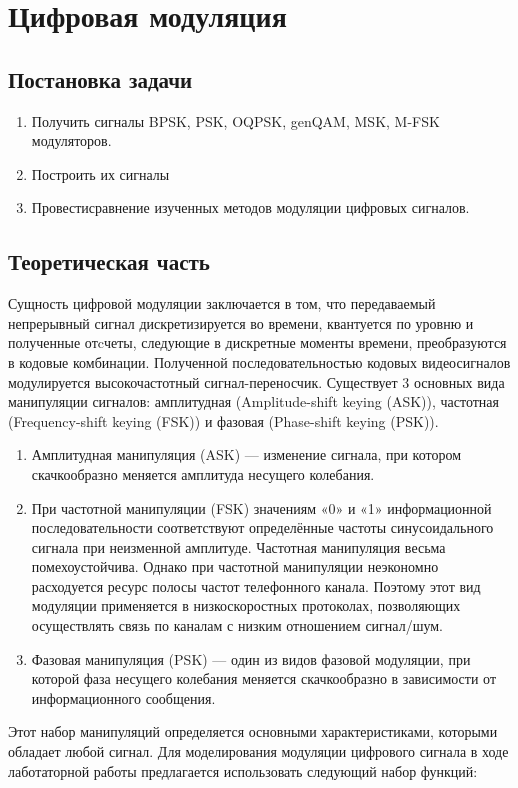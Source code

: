 \chapter{Цифровая модуляция}
\section{Постановка задачи}
\begin{enumerate}
\item 
Получить сигналы BPSK, PSK, OQPSK, genQAM, MSK, M-FSK модуляторов.
\item
Построить их сигналы
\item
Провестисравнение изученных методов модуляции цифровых сигналов.
\end{enumerate}
\section{Теоретическая часть}
Сущность цифровой модуляции заключается в том, что передаваемый непрерывный сигнал дискретизируется во времени, квантуется по уровню и полученные отcчеты, следующие в дискретные моменты времени, преобразуются в кодовые комбинации. Полученной последовательностью кодовых видеосигналов модулируется высокочастотный сигнал-переносчик.
Существует 3 основных вида манипуляции сигналов: амплитудная (Amplitude-shift keying (ASK)), частотная (Frequency-shift keying (FSK)) и фазовая (Phase-shift keying (PSK)).
\begin{enumerate}
\item Амплитудная манипуляция (ASK) — изменение сигнала, при котором скачкообразно меняется амплитуда несущего колебания. 
\item При частотной манипуляции (FSK) значениям «0» и «1» информационной последовательности соответствуют определённые частоты синусоидального сигнала при неизменной амплитуде. Частотная манипуляция весьма помехоустойчива. Однако при частотной манипуляции неэкономно расходуется ресурс полосы частот телефонного канала. Поэтому этот вид модуляции применяется в низкоскоростных протоколах, позволяющих осуществлять связь по каналам с низким отношением сигнал/шум.
\item Фазовая манипуляция (PSK) — один из видов фазовой модуляции, при которой фаза несущего колебания меняется скачкообразно в зависимости от информационного сообщения.
\end{enumerate}
Этот набор манипуляций определяется основными характеристиками, которыми обладает любой сигнал. Для моделирования модуляции цифрового сигнала в ходе лаботаторной работы предлагается использовать следующий набор функций:
